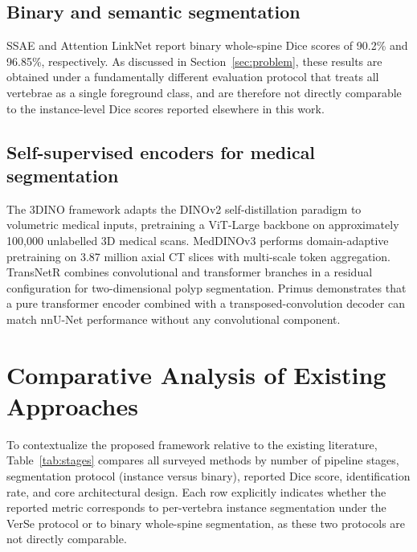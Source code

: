 \documentclass[preprint,12pt,3p]{elsarticle}
\begin{document}
\subsection{Binary and semantic segmentation}
SSAE \cite{ssae2022} and Attention LinkNet \cite{alhamouri2025} report binary whole-spine Dice scores of 90.2\% and 96.85\%, respectively. As discussed in Section~\ref{sec:problem}, these results are obtained under a fundamentally different evaluation protocol that treats all vertebrae as a single foreground class, and are therefore not directly comparable to the instance-level Dice scores reported elsewhere in this work.

\subsection{Self-supervised encoders for medical segmentation}
The 3DINO framework \cite{xu2025_3dino} adapts the DINOv2 self-distillation paradigm \cite{oquab2023} to volumetric medical inputs, pretraining a ViT-Large backbone on approximately 100{,}000 unlabelled 3D medical scans. MedDINOv3 \cite{yuheng2025} performs domain-adaptive pretraining on 3.87 million axial CT slices with multi-scale token aggregation. TransNetR \cite{rahman2023} combines convolutional and transformer branches in a residual configuration for two-dimensional polyp segmentation. Primus \cite{wald2025_primus} demonstrates that a pure transformer encoder combined with a transposed-convolution decoder can match nnU-Net performance without any convolutional component.

\section{Comparative Analysis of Existing Approaches}
\label{sec:comparison}

To contextualize the proposed framework relative to the existing literature, Table~\ref{tab:stages} compares all surveyed methods by number of pipeline stages, segmentation protocol (instance versus binary), reported Dice score, identification rate, and core architectural design. Each row explicitly indicates whether the reported metric corresponds to per-vertebra instance segmentation under the VerSe protocol or to binary whole-spine segmentation, as these two protocols are not directly comparable.
\end{document}

